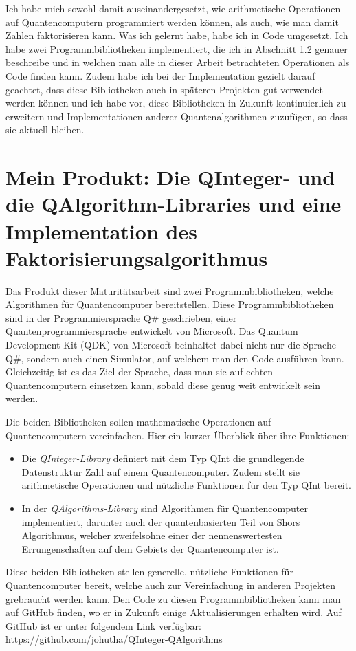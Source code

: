 Ich habe mich sowohl damit auseinandergesetzt, wie arithmetische Operationen auf Quantencomputern programmiert werden können, als auch, wie man damit Zahlen faktorisieren kann. Was ich gelernt habe, habe ich in Code umgesetzt. Ich habe zwei Programmbibliotheken implementiert, die ich in Abschnitt 1.2 genauer beschreibe und in welchen man alle in dieser Arbeit betrachteten Operationen als Code finden kann.  Zudem habe ich bei der Implementation gezielt darauf geachtet, dass diese Bibliotheken auch in späteren Projekten gut verwendet werden können und ich habe vor, diese Bibliotheken in Zukunft kontinuierlich zu erweitern und Implementationen anderer Quantenalgorithmen zuzufügen, so dass sie aktuell bleiben. 

\section{Mein Produkt: Die QInteger- und die QAlgorithm-Libraries und eine Implementation des Faktorisierungsalgorithmus}
Das Produkt dieser Maturitätsarbeit sind zwei Programmbibliotheken, welche Algorithmen für Quantencomputer bereitstellen. Diese Programmbibliotheken sind in der Programmiersprache Q\# geschrieben, einer Quantenprogrammiersprache entwickelt von Microsoft. Das Quantum Development Kit (QDK) von Microsoft beinhaltet dabei nicht nur die Sprache Q\#, sondern auch einen Simulator, auf welchem man den Code ausführen kann. Gleichzeitig ist es das Ziel der Sprache, dass man sie auf echten Quantencomputern einsetzen kann, sobald diese genug weit entwickelt sein werden.

Die beiden Bibliotheken sollen mathematische Operationen auf Quantencomputern vereinfachen. Hier ein kurzer Überblick über ihre Funktionen: %
\begin{itemize}
  \item Die \textit{QInteger-Library} definiert mit dem Typ \grqq QInt\grqq{} die grundlegende Datenstruktur \grqq Zahl\grqq{} auf einem Quantencomputer. Zudem stellt sie arithmetische Operationen und nützliche Funktionen für den Typ \grqq QInt\grqq{} bereit. %
  \item In der \textit{QAlgorithms-Library} sind Algorithmen für Quantencomputer implementiert, darunter auch der quantenbasierten Teil von Shors Algorithmus, welcher zweifelsohne einer der nennenswertesten Errungenschaften auf dem Gebiets der Quantencomputer ist.
\end{itemize}
Diese beiden Bibliotheken stellen generelle, nützliche Funktionen für Quantencomputer bereit, welche auch zur Vereinfachung in anderen Projekten grebraucht werden kann. Den Code zu diesen Programmbibliotheken kann man auf GitHub finden, wo er in Zukunft einige Aktualisierungen erhalten wird. Auf GitHub ist er unter folgendem Link verfügbar: https://github.com/johutha/QInteger-QAlgorithms


